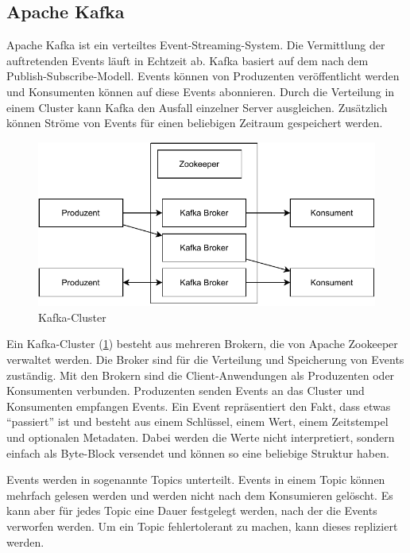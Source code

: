 \subsection{Apache Kafka}
\label{sec:kafka}

Apache Kafka ist ein verteiltes Event-Streaming-System.
Die Vermittlung der auftretenden Events läuft in Echtzeit ab.
Kafka basiert auf dem nach dem Publish-Subscribe-Modell.
Events können von Produzenten veröffentlicht werden und Konsumenten können auf diese Events abonnieren.
Durch die Verteilung in einem Cluster kann Kafka den Ausfall einzelner Server ausgleichen.
Zusätzlich können Ströme von Events für einen beliebigen Zeitraum gespeichert werden.

\begin{figure}
    \centering
    \includegraphics{Grafiken/Grundlagen/Kafka-Cluster.pdf}
    \caption{Kafka-Cluster}
    \label{fig:kafka-cluster}
\end{figure}

Ein Kafka-Cluster (\cref{fig:kafka-cluster}) besteht aus mehreren Brokern, die von Apache Zookeeper verwaltet werden.
Die Broker sind für die Verteilung und Speicherung von Events zuständig.
Mit den Brokern sind die Client-Anwendungen als Produzenten oder Konsumenten verbunden.
Produzenten senden Events an das Cluster und Konsumenten empfangen Events.
Ein Event repräsentiert den Fakt, dass etwas "`passiert"' ist und besteht aus einem Schlüssel, einem Wert, einem Zeitstempel und optionalen Metadaten.
Dabei werden die Werte nicht interpretiert, sondern einfach als Byte-Block versendet und können so eine beliebige Struktur haben.

Events werden in sogenannte Topics unterteilt.
Events in einem Topic können mehrfach gelesen werden und werden nicht nach dem Konsumieren gelöscht.
Es kann aber für jedes Topic eine Dauer festgelegt werden, nach der die Events verworfen werden.
Um ein Topic fehlertolerant zu machen, kann dieses repliziert werden.

